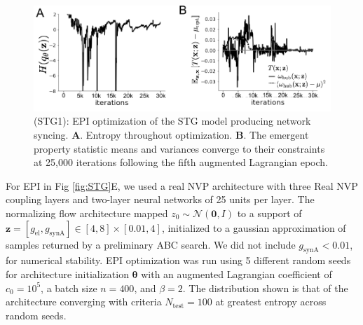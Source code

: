 \documentclass[11pt]{article}
\begin{document}
\begin{figure}
\begin{center}
\includegraphics[scale=0.8]{figures/figSTG1/figSTG1.pdf}
\end{center}
\begin{flushleft}
\caption{\small (STG1): EPI optimization of the STG model producing network syncing. 
\textbf{A}. Entropy throughout optimization. 
\textbf{B}. The emergent property statistic means and variances converge to their constraints at 25,000 iterations following the fifth augmented Lagrangian epoch.}
\end{flushleft}
\label{fig:STG1}
\end{figure}

For EPI in Fig \ref{fig:STG}E, we used a real NVP architecture with three Real NVP coupling layers and two-layer neural networks of 25 units per layer.
The normalizing flow architecture mapped $z_0 \sim \mathcal{N}(\mathbf{0}, I)$ to a support of $\mathbf{z} = [g_{\text{el}}, g_{\text{synA}}] \in [4,8] \times [0.01,4]$, initialized to a gaussian approximation of samples returned by a preliminary ABC search.
We did not include $g_{\text{synA}} < 0.01$, for numerical stability.
EPI optimization was run using 5 different random seeds for architecture initialization $\bm{\theta}$ with an augmented Lagrangian coefficient of $c_0 = 10^{5}$, a batch size $n=400$, and $\beta = 2$.
The distribution shown is that of the architecture converging with criteria $N_{\text{test}} = 100$ at greatest entropy across random seeds.
\end{document}
